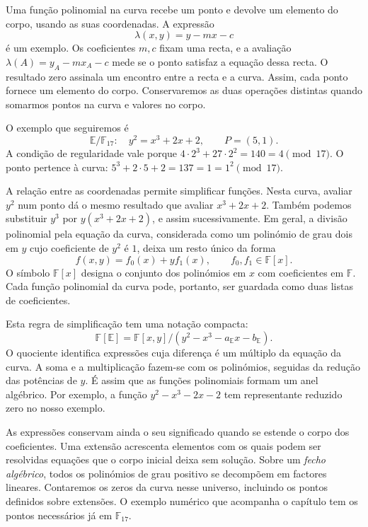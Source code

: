 Uma função polinomial na curva recebe um ponto e devolve um elemento do
corpo, usando as suas coordenadas. A expressão
\[
 \lambda(x,y)=y-mx-c
\]
é um exemplo. Os coeficientes \(m,c\) fixam uma recta, e a avaliação
\(\lambda(A)=y_A-mx_A-c\) mede se o ponto satisfaz a equação dessa
recta. O resultado zero assinala um encontro entre a recta e a curva.
Assim, cada ponto fornece um elemento do corpo. Conservaremos as duas
operações distintas quando somarmos pontos na curva e valores no corpo.

O exemplo que seguiremos é
\[
 \mathbb E/\mathbb F_{17}:\quad y^2=x^3+2x+2,
 \qquad P=(5,1).
\]
A condição de regularidade vale porque
\(4\cdot2^3+27\cdot2^2=140=4\pmod {17}\). O ponto pertence à curva:
\(5^3+2\cdot5+2=137=1=1^2\pmod {17}\).

A relação entre as coordenadas permite simplificar funções. Nesta curva,
avaliar \(y^2\) num ponto dá o mesmo resultado que avaliar
\(x^3+2x+2\). Também podemos substituir \(y^3\) por
\(y(x^3+2x+2)\), e assim sucessivamente. Em geral, a divisão
polinomial pela equação da curva, considerada como um polinómio de
grau dois em \(y\) cujo coeficiente de \(y^2\) é \(1\), deixa um resto
único da forma
\begin{equation}
 f(x,y)=f_0(x)+yf_1(x),
 \qquad f_0,f_1\in\mathbb F[x].
 \label{eq:fcmp-reduced-function-representative}
\end{equation}
O símbolo \(\mathbb F[x]\) designa o conjunto dos polinómios em \(x\)
com coeficientes em \(\mathbb F\). Cada função polinomial da curva pode,
portanto, ser guardada como duas listas de coeficientes.

Esta regra de simplificação tem uma notação compacta:
\[
 \mathbb F[\mathbb E]
 =\mathbb F[x,y]/(y^2-x^3-a_{\mathbb E}x-b_{\mathbb E}).
\]
O quociente identifica expressões cuja diferença é um múltiplo da
equação da curva. A soma e a multiplicação fazem-se com os polinómios,
seguidas da redução das potências de \(y\). É assim que as funções
polinomiais formam um anel algébrico. Por exemplo, a função
\(y^2-x^3-2x-2\) tem representante reduzido zero no nosso exemplo.

As expressões conservam ainda o seu significado quando se estende o
corpo dos coeficientes. Uma extensão acrescenta elementos com os quais
podem ser resolvidas equações que o corpo inicial deixa sem solução.
Sobre um \emph{fecho algébrico}, todos os polinómios de grau positivo se
decompõem em factores lineares. Contaremos os zeros da curva nesse
universo, incluindo os pontos definidos sobre extensões. O exemplo
numérico que acompanha o capítulo tem os pontos necessários já em
\(\mathbb F_{17}\).

